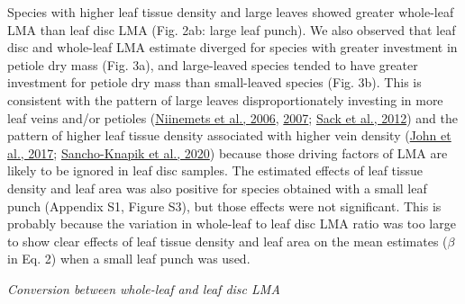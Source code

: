 \documentclass[
  12pt,
  a4paper,
,tablecaptionabove
]{scrartcl}
\begin{document}
Species with higher leaf tissue density and large leaves showed greater whole-leaf LMA than leaf disc LMA (Fig. 2ab: large leaf punch).
We also observed that leaf disc and whole-leaf LMA estimate diverged for species with greater investment in petiole dry mass (Fig. 3a), and large-leaved species tended to have greater investment for petiole dry mass than small-leaved species (Fig. 3b).
This is consistent with the pattern of large leaves disproportionately investing in more leaf veins and/or petioles (\protect\hyperlink{ref-Niinemets2006}{Niinemets et al., 2006}, \protect\hyperlink{ref-Niinemets2007}{2007}; \protect\hyperlink{ref-Sack2012}{Sack et al., 2012}) and the pattern of higher leaf tissue density associated with higher vein density (\protect\hyperlink{ref-John2017}{John et al., 2017}; \protect\hyperlink{ref-Sancho-Knapik2020}{Sancho-Knapik et al., 2020}) because those driving factors of LMA are likely to be ignored in leaf disc samples.
The estimated effects of leaf tissue density and leaf area was also positive for species obtained with a small leaf punch (Appendix S1, Figure S3), but those effects were not significant.
This is probably because the variation in whole-leaf to leaf disc LMA ratio was too large to show clear effects of leaf tissue density and leaf area on the mean estimates (\(\beta\) in Eq. 2) when a small leaf punch was used.

\emph{Conversion between whole-leaf and leaf disc LMA}
\end{document}
